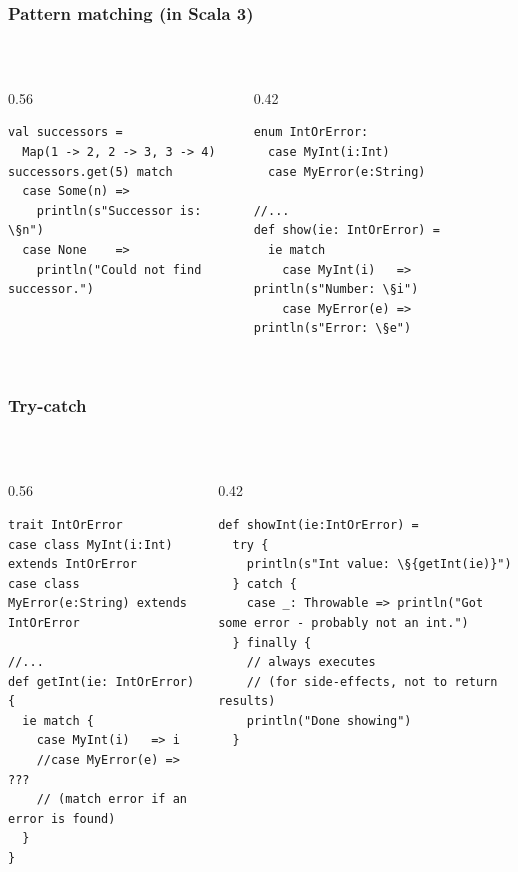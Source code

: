 \documentclass[aspectratio=169]{beamer}
\begin{document}
\begin{frame}[fragile]\frametitle{Pattern matching (in Scala 3)}
~\\[-8mm]
\begin{columns}
\begin{column}{0.56\textwidth}
\begin{lstlisting}
val successors =
  Map(1 -> 2, 2 -> 3, 3 -> 4)
successors.get(5) match
  case Some(n) =>
    println(s"Successor is: \§n")
  case None    =>
    println("Could not find successor.")
\end{lstlisting}
\end{column}
\begin{column}{0.42\textwidth}
\begin{lstlisting}[morekeywords={enum}]
enum IntOrError:
  case MyInt(i:Int)
  case MyError(e:String)

//...
def show(ie: IntOrError) =
  ie match 
    case MyInt(i)   => println(s"Number: \§i")
    case MyError(e) => println(s"Error: \§e")
  
\end{lstlisting}
\end{column}
\end{columns}
\end{frame}


\begin{frame}[fragile]\frametitle{Try-catch}
~\\[-8mm]
\begin{columns}
\begin{column}{0.56\textwidth}
\begin{lstlisting}
trait IntOrError
case class MyInt(i:Int)      extends IntOrError
case class MyError(e:String) extends IntOrError

//...
def getInt(ie: IntOrError) {
  ie match {
    case MyInt(i)   => i
    //case MyError(e) => ???
    // (match error if an error is found)
  }
}
\end{lstlisting}
\end{column}
\begin{column}{0.42\textwidth}
\begin{lstlisting}
def showInt(ie:IntOrError) = 
  try {
    println(s"Int value: \§{getInt(ie)}")
  } catch { 
    case _: Throwable => println("Got some error - probably not an int.")
  } finally {
    // always executes
    // (for side-effects, not to return results)
    println("Done showing")
  }
\end{lstlisting}
\end{column}
\end{columns}
\end{frame}
\end{document}
